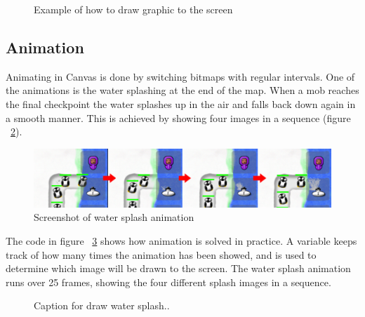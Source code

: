 \begin{figure}[htb]

\begin{small}

\end{small}

\caption{Example of how to draw graphic to the screen}
\label{fig:codeExDrawMoney}
\end{figure}

\subsection{Animation}

Animating in Canvas is done by switching bitmaps with regular intervals. One of the animations is the water splashing at the end of the map. When a mob reaches the final checkpoint the water splashes up in the air and falls back down again in a smooth manner. This is achieved by showing four images in a sequence (figure ~\ref{fig:waterSplashAnimation}).

\begin{figure}[here]
\begin{center}
\includegraphics[scale=0.6]{pics/chapters/chapter4/splash2}
\end{center}
\caption{Screenshot of water splash animation}
\label{fig:waterSplashAnimation}
\end{figure}

The code in figure ~\ref{fig:codeExDrawWaterSplash} shows how animation is solved in practice. A variable keeps track of how many times the animation has been showed, and is used to determine which image will be drawn to the screen. The water splash animation runs over 25 frames, showing the four different splash images in a sequence.

\begin{figure}[htb]

\begin{small}

\end{small}

\caption{Caption for draw water splash..}
\label{fig:codeExDrawWaterSplash}
\end{figure}

